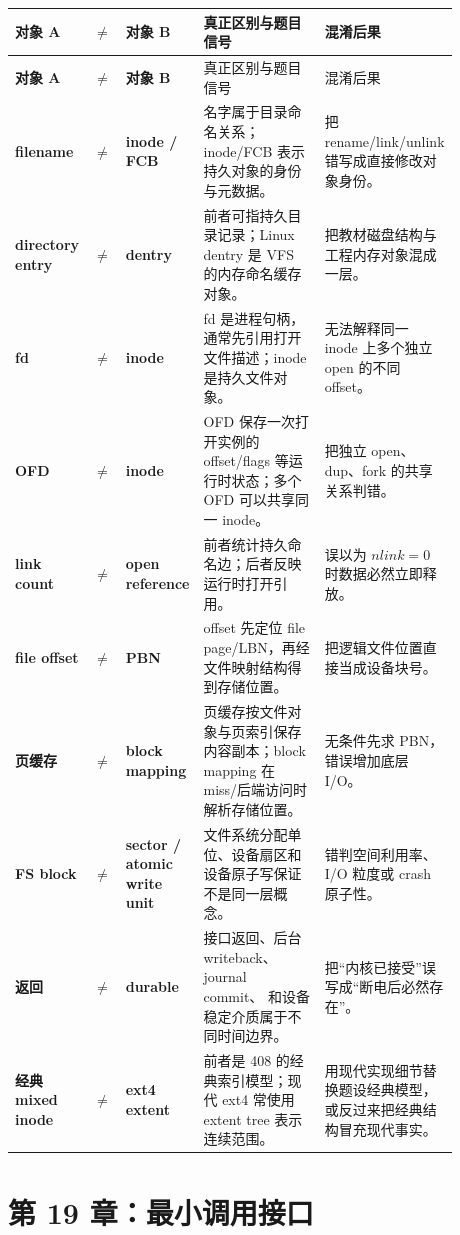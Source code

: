 \documentclass[11pt,a4paper]{ctexart}
\newcommand{\code}[1]{\texttt{\detokenize{#1}}}
\begin{document}
\begingroup
\footnotesize
\renewcommand{\arraystretch}{1.22}
\begin{longtable}{>{\bfseries}p{0.15\linewidth} >{\centering\arraybackslash}p{0.025\linewidth} >{\bfseries}p{0.15\linewidth} p{0.31\linewidth} p{0.25\linewidth}}
\toprule
对象 A & $\neq$ & 对象 B & 真正区别与题目信号 & 混淆后果\\
\midrule
\endfirsthead
\toprule
对象 A & $\neq$ & 对象 B & 真正区别与题目信号 & 混淆后果\\
\midrule
\endhead
filename & $\neq$ & inode / FCB & 名字属于目录命名关系；inode/FCB 表示持久对象的身份与元数据。 & 把 rename/link/unlink 错写成直接修改对象身份。\\
directory entry & $\neq$ & dentry & 前者可指持久目录记录；Linux dentry 是 VFS 的内存命名缓存对象。 & 把教材磁盘结构与工程内存对象混成一层。\\
fd & $\neq$ & inode & fd 是进程句柄，通常先引用打开文件描述；inode 是持久文件对象。 & 无法解释同一 inode 上多个独立 open 的不同 offset。\\
OFD & $\neq$ & inode & OFD 保存一次打开实例的 offset/flags 等运行时状态；多个 OFD 可以共享同一 inode。 & 把独立 open、dup、fork 的共享关系判错。\\
link count & $\neq$ & open reference & 前者统计持久命名边；后者反映运行时打开引用。 & 误以为 $nlink=0$ 时数据必然立即释放。\\
file offset & $\neq$ & PBN & offset 先定位 file page/LBN，再经文件映射结构得到存储位置。 & 把逻辑文件位置直接当成设备块号。\\
页缓存 & $\neq$ & block mapping & 页缓存按文件对象与页索引保存内容副本；block mapping 在 miss/后端访问时解析存储位置。 & 无条件先求 PBN，错误增加底层 I/O。\\
FS block & $\neq$ & sector / atomic write unit & 文件系统分配单位、设备扇区和设备原子写保证不是同一层概念。 & 错判空间利用率、I/O 粒度或 crash 原子性。\\
\code{write()} 返回 & $\neq$ & durable & 接口返回、后台 writeback、journal commit、\code{fsync()} 和设备稳定介质属于不同时间边界。 & 把“内核已接受”误写成“断电后必然存在”。\\
经典 mixed inode & $\neq$ & ext4 extent & 前者是 408 的经典索引模型；现代 ext4 常使用 extent tree 表示连续范围。 & 用现代实现细节替换题设经典模型，或反过来把经典结构冒充现代事实。\\
\bottomrule
\end{longtable}
\endgroup

\section{第 19 章：最小调用接口}
\end{document}
